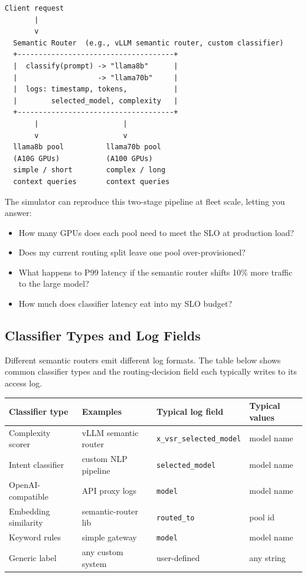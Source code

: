 \documentclass[11pt,a4paper]{article}
\begin{document}
\begin{lstlisting}[style=output]
  Client request
       |
       v
  Semantic Router  (e.g., vLLM semantic router, custom classifier)
  +-------------------------------------+
  |  classify(prompt) -> "llama8b"      |
  |                   -> "llama70b"     |
  |  logs: timestamp, tokens,           |
  |        selected_model, complexity   |
  +-------------------------------------+
       |                    |
       v                    v
  llama8b pool          llama70b pool
  (A10G GPUs)           (A100 GPUs)
  simple / short        complex / long
  context queries       context queries
\end{lstlisting}

The simulator can reproduce this two-stage pipeline at fleet scale,
letting you answer:

\begin{itemize}[nosep]
  \item How many GPUs does each pool need to meet the SLO at production load?
  \item Does my current routing split leave one pool over-provisioned?
  \item What happens to P99 latency if the semantic router shifts 10\% more
        traffic to the large model?
  \item How much does classifier latency eat into my SLO budget?
\end{itemize}

\subsection{Classifier Types and Log Fields}

Different semantic routers emit different log formats.  The table below
shows common classifier types and the routing-decision field each
typically writes to its access log.

\begin{center}
\begin{tabular}{llll}
\toprule
Classifier type & Examples & Typical log field & Typical values \\
\midrule
Complexity scorer & vLLM semantic router & \texttt{x\_vsr\_selected\_model} & model name \\
Intent classifier & custom NLP pipeline & \texttt{selected\_model} & model name \\
OpenAI-compatible & API proxy logs & \texttt{model} & model name \\
Embedding similarity & semantic-router lib & \texttt{routed\_to} & pool id \\
Keyword rules & simple gateway & \texttt{model} & model name \\
\midrule
Generic label & any custom system & user-defined & any string \\
\bottomrule
\end{tabular}
\end{center}
\end{document}
